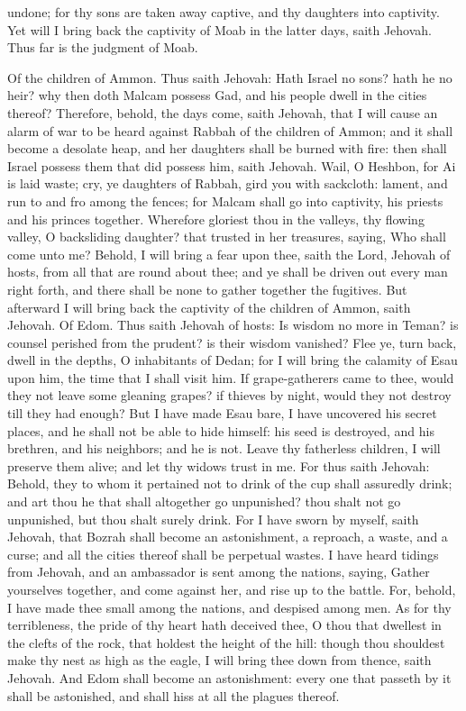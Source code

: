 undone; for thy sons are taken away captive, and thy daughters into captivity. Yet will I bring back the captivity of Moab in the latter days, saith Jehovah. Thus far is the judgment of Moab. 

Of the children of Ammon. Thus saith Jehovah: Hath Israel no sons? hath he no heir? why then doth Malcam possess Gad, and his people dwell in the cities thereof? Therefore, behold, the days come, saith Jehovah, that I will cause an alarm of war to be heard against Rabbah of the children of Ammon; and it shall become a desolate heap, and her daughters shall be burned with fire: then shall Israel possess them that did possess him, saith Jehovah. Wail, O Heshbon, for Ai is laid waste; cry, ye daughters of Rabbah, gird you with sackcloth: lament, and run to and fro among the fences; for Malcam shall go into captivity, his priests and his princes together. Wherefore gloriest thou in the valleys, thy flowing valley, O backsliding daughter? that trusted in her treasures, saying, Who shall come unto me? Behold, I will bring a fear upon thee, saith the Lord, Jehovah of hosts, from all that are round about thee; and ye shall be driven out every man right forth, and there shall be none to gather together the fugitives. But afterward I will bring back the captivity of the children of Ammon, saith Jehovah.  Of Edom. Thus saith Jehovah of hosts: Is wisdom no more in Teman? is counsel perished from the prudent? is their wisdom vanished? Flee ye, turn back, dwell in the depths, O inhabitants of Dedan; for I will bring the calamity of Esau upon him, the time that I shall visit him. If grape-gatherers came to thee, would they not leave some gleaning grapes? if thieves by night, would they not destroy till they had enough? But I have made Esau bare, I have uncovered his secret places, and he shall not be able to hide himself: his seed is destroyed, and his brethren, and his neighbors; and he is not. Leave thy fatherless children, I will preserve them alive; and let thy widows trust in me. For thus saith Jehovah: Behold, they to whom it pertained not to drink of the cup shall assuredly drink; and art thou he that shall altogether go unpunished? thou shalt not go unpunished, but thou shalt surely drink. For I have sworn by myself, saith Jehovah, that Bozrah shall become an astonishment, a reproach, a waste, and a curse; and all the cities thereof shall be perpetual wastes.  I have heard tidings from Jehovah, and an ambassador is sent among the nations, saying, Gather yourselves together, and come against her, and rise up to the battle. For, behold, I have made thee small among the nations, and despised among men. As for thy terribleness, the pride of thy heart hath deceived thee, O thou that dwellest in the clefts of the rock, that holdest the height of the hill: though thou shouldest make thy nest as high as the eagle, I will bring thee down from thence, saith Jehovah. And Edom shall become an astonishment: every one that passeth by it shall be astonished, and shall hiss at all the plagues thereof. 